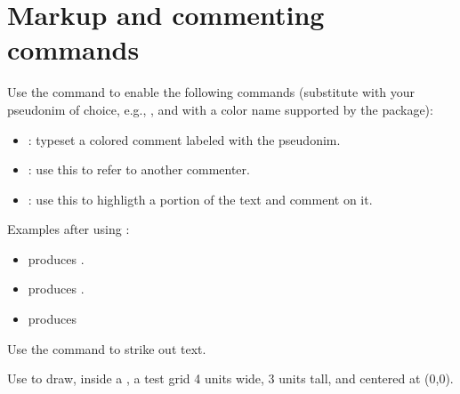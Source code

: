 \section*{Markup and commenting commands}
Use the command  to enable the following commands (substitute  with your pseudonim of choice, e.g., , and  with a color name supported by the  package):
\begin{itemize}
\item {}: typeset a colored comment labeled with the pseudonim.
\item {}: use this to refer to another commenter.
\item {}: use this to highligth a portion of the text and comment on it.
\end{itemize}
Examples after using :
\begin{itemize}
\item {} produces .
\item {} produces \atrtron.
\item {} produces 
\end{itemize}

Use the command  to strike out text.

Use  to draw, inside a , a test grid 4 units wide, 3 units tall, and centered at (0,0).